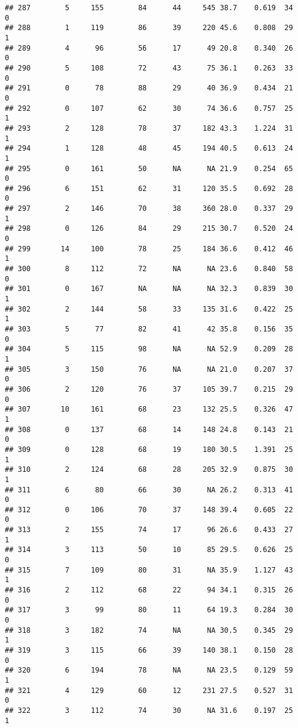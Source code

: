 \documentclass[
]{article}
\begin{document}
\begin{verbatim}
## 287        5     155        84      44     545 38.7    0.619  34    0
## 288        1     119        86      39     220 45.6    0.808  29    1
## 289        4      96        56      17      49 20.8    0.340  26    0
## 290        5     108        72      43      75 36.1    0.263  33    0
## 291        0      78        88      29      40 36.9    0.434  21    0
## 292        0     107        62      30      74 36.6    0.757  25    1
## 293        2     128        78      37     182 43.3    1.224  31    1
## 294        1     128        48      45     194 40.5    0.613  24    1
## 295        0     161        50      NA      NA 21.9    0.254  65    0
## 296        6     151        62      31     120 35.5    0.692  28    0
## 297        2     146        70      38     360 28.0    0.337  29    1
## 298        0     126        84      29     215 30.7    0.520  24    0
## 299       14     100        78      25     184 36.6    0.412  46    1
## 300        8     112        72      NA      NA 23.6    0.840  58    0
## 301        0     167        NA      NA      NA 32.3    0.839  30    1
## 302        2     144        58      33     135 31.6    0.422  25    1
## 303        5      77        82      41      42 35.8    0.156  35    0
## 304        5     115        98      NA      NA 52.9    0.209  28    1
## 305        3     150        76      NA      NA 21.0    0.207  37    0
## 306        2     120        76      37     105 39.7    0.215  29    0
## 307       10     161        68      23     132 25.5    0.326  47    1
## 308        0     137        68      14     148 24.8    0.143  21    0
## 309        0     128        68      19     180 30.5    1.391  25    1
## 310        2     124        68      28     205 32.9    0.875  30    1
## 311        6      80        66      30      NA 26.2    0.313  41    0
## 312        0     106        70      37     148 39.4    0.605  22    0
## 313        2     155        74      17      96 26.6    0.433  27    1
## 314        3     113        50      10      85 29.5    0.626  25    0
## 315        7     109        80      31      NA 35.9    1.127  43    1
## 316        2     112        68      22      94 34.1    0.315  26    0
## 317        3      99        80      11      64 19.3    0.284  30    0
## 318        3     182        74      NA      NA 30.5    0.345  29    1
## 319        3     115        66      39     140 38.1    0.150  28    0
## 320        6     194        78      NA      NA 23.5    0.129  59    1
## 321        4     129        60      12     231 27.5    0.527  31    0
## 322        3     112        74      30      NA 31.6    0.197  25    1

\end{verbatim}
\end{document}
